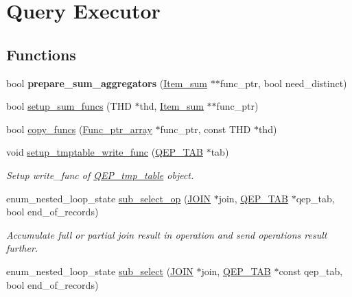 \hypertarget{group__Query__Executor}{}\section{Query Executor}
\label{group__Query__Executor}
\subsection*{Functions}
\begin{DoxyCompactItemize}
\item 
\mbox{\label{group__Query__Executor_ga1cc817dd0c7e9e7ba403b55f4b20a3fb}} 
bool {\bfseries prepare\+\_\+sum\+\_\+aggregators} (\mbox{\hyperlink{classItem__sum}{Item\+\_\+sum}} $\ast$$\ast$func\+\_\+ptr, bool need\+\_\+distinct)
\item 
bool \mbox{\hyperlink{group__Query__Executor_ga1b1125b75ed00a408f039bb83de7c480}{setup\+\_\+sum\+\_\+funcs}} (T\+HD $\ast$thd, \mbox{\hyperlink{classItem__sum}{Item\+\_\+sum}} $\ast$$\ast$func\+\_\+ptr)
\item 
bool \mbox{\hyperlink{group__Query__Executor_ga7f64c00677c38e6f233e43f47a52aef7}{copy\+\_\+funcs}} (\mbox{\hyperlink{classMem__root__array}{Func\+\_\+ptr\+\_\+array}} $\ast$func\+\_\+ptr, const T\+HD $\ast$thd)
\item 
void \mbox{\hyperlink{group__Query__Executor_ga2b6b23af4fddf731279c6dfdbd084659}{setup\+\_\+tmptable\+\_\+write\+\_\+func}} (\mbox{\hyperlink{classQEP__TAB}{Q\+E\+P\+\_\+\+T\+AB}} $\ast$tab)
\begin{DoxyCompactList}\small\item\em Setup write\+\_\+func of \mbox{\hyperlink{classQEP__tmp__table}{Q\+E\+P\+\_\+tmp\+\_\+table}} object. \end{DoxyCompactList}\item 
enum\+\_\+nested\+\_\+loop\+\_\+state \mbox{\hyperlink{group__Query__Executor_gacddd73f0964f6141ef2666b7ac8a3997}{sub\+\_\+select\+\_\+op}} (\mbox{\hyperlink{classJOIN}{J\+O\+IN}} $\ast$join, \mbox{\hyperlink{classQEP__TAB}{Q\+E\+P\+\_\+\+T\+AB}} $\ast$qep\+\_\+tab, bool end\+\_\+of\+\_\+records)
\begin{DoxyCompactList}\small\item\em Accumulate full or partial join result in operation and send operation\textquotesingle{}s result further. \end{DoxyCompactList}\item 
enum\+\_\+nested\+\_\+loop\+\_\+state \mbox{\hyperlink{group__Query__Executor_ga09a751162b6ad6ce37cc4db2c77cc158}{sub\+\_\+select}} (\mbox{\hyperlink{classJOIN}{J\+O\+IN}} $\ast$join, \mbox{\hyperlink{classQEP__TAB}{Q\+E\+P\+\_\+\+T\+AB}} $\ast$const qep\+\_\+tab, bool end\+\_\+of\+\_\+records)

\end{DoxyCompactItemize}

